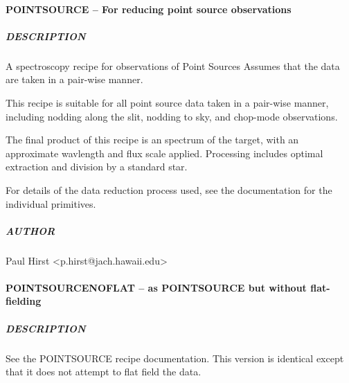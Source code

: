 \documentclass[twoside,11pt]{article}
\renewcommand{\_}{\texttt{\symbol{95}}}
\begin{document}
\paragraph*{POINT\_SOURCE -- For reducing point source observations\label{POINT_SOURCE_--_For_reducing_point_source_observations}}



\subparagraph*{DESCRIPTION\label{POINT_SOURCE_--_For_reducing_point_source_observations_DESCRIPTION}}

A spectroscopy recipe for observations of Point Sources
Assumes that the data are taken in a pair-wise manner.



This recipe is suitable for all point source data taken in a pair-wise
manner, including nodding along the slit, nodding to sky, and
chop-mode observations.



The final product of this recipe is an spectrum of the target, with an
approximate wavlength and flux scale applied. Processing includes
optimal extraction and division by a standard star.



For details of the data reduction process used, see the documentation
for the individual primitives.

\subparagraph*{AUTHOR\label{POINT_SOURCE_--_For_reducing_point_source_observations_AUTHOR}}

Paul Hirst <p.hirst@jach.hawaii.edu>

\paragraph*{POINT\_SOURCE\_NOFLAT -- as POINT\_SOURCE but without flat-fielding\label{POINT_SOURCE_NOFLAT_--_as_POINT_SOURCE_but_without_flat-fielding}}



\subparagraph*{DESCRIPTION\label{POINT_SOURCE_NOFLAT_--_as_POINT_SOURCE_but_without_flat-fielding_DESCRIPTION}}

See the POINT\_SOURCE recipe documentation. This version is identical except
that it does not attempt to flat field the data.
\end{document}

